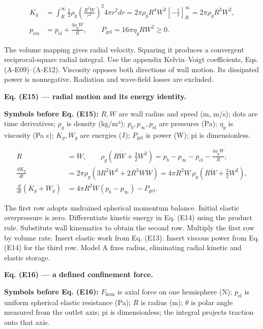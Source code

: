 \documentclass[11pt]{article}
\begin{document}
\begin{equation*}
\begin{aligned}
K_g&=\int_R^\infty\frac12\rho_g\left(\frac{R^2W}{r^2}\right)^2 4\pi r^2dr
=2\pi\rho_gR^4W^2\left[-\frac1r\right]_R^\infty
=2\pi\rho_gR^3W^2,\\
p_{\mathrm{res}}&=p_{\mathrm{el}}+\frac{4\eta_gW}{R},\qquad
P_{\mathrm{gel}}=16\pi\eta_gRW^2\ge0.
\end{aligned}
\end{equation*}

The volume mapping gives radial velocity. Squaring it produces a convergent reciprocal-square radial integral. Use the appendix Kelvin–Voigt coefficients, Eqs. (A-E09)–(A-E12). Viscosity opposes both directions of wall motion. Its dissipated power is nonnegative. Radiation and wave-field losses are excluded.


\textbf{Eq. (E15) — radial motion and its energy identity.}


\textbf{Symbols before Eq. (E15):} \(R,W\) are wall radius and speed (m, m/s); dots are time derivatives; \(\rho_g\) is density (kg/m³); \(p_b,p_\infty,p_{\mathrm{el}}\) are pressures (Pa); \(\eta_g\) is viscosity (Pa s); \(K_g,W_g\) are energies (J); \(P_{\mathrm{gel}}\) is power (W); pi is dimensionless.



\begin{equation*}
\begin{aligned}
\dot R&=W,\qquad
\rho_g\left(R\dot W+\frac32W^2\right)=p_b-p_\infty-p_{\mathrm{el}}-\frac{4\eta_gW}{R},\\
\frac{dK_g}{dt}&=2\pi\rho_g(3R^2W^3+2R^3W\dot W)
=4\pi R^2W\,\rho_g\left(R\dot W+\frac32W^2\right),\\
\frac{d}{dt}(K_g+W_g)&=4\pi R^2W(p_b-p_\infty)-P_{\mathrm{gel}}.
\end{aligned}
\end{equation*}

The first row adopts undrained spherical momentum balance. Initial elastic overpressure is zero. Differentiate kinetic energy in Eq. (E14) using the product rule. Substitute wall kinematics to obtain the second row. Multiply the first row by volume rate. Insert elastic work from Eq. (E13). Insert viscous power from Eq. (E14) for the third row. Model A fixes radius, eliminating radial kinetic and elastic storage.


\textbf{Eq. (E16) — a defined confinement force.}


\textbf{Symbols before Eq. (E16):} \(F_{\mathrm{hem}}\) is axial force on one hemisphere (N); \(p_{\mathrm{el}}\) is uniform spherical elastic resistance (Pa); \(R\) is radius (m); \(\theta\) is polar angle measured from the outlet axis; pi is dimensionless; the integral projects traction onto that axis.
\end{document}
